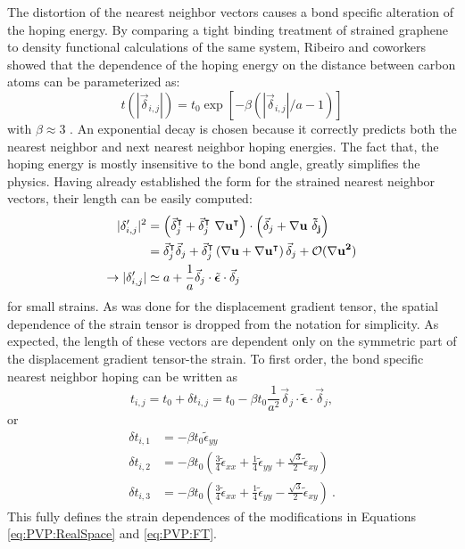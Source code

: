 The distortion of the nearest neighbor vectors causes a bond specific alteration of the hoping energy.
By comparing a tight binding treatment of strained graphene to density functional calculations of the same system, Ribeiro and coworkers showed that the dependence of the hoping energy on the distance between carbon atoms can be parameterized as:
\begin{equation*}
  t(|\vec{\delta}_{i,j}|)=t_0 \exp[-\beta (|\vec{\delta}_{i,j}|/a-1)]
\end{equation*}
with $\beta\approx 3$ \cite{Pereira2009,Ribeiro2009,CastroNeto2009}.
An exponential decay is chosen because it correctly predicts both the nearest neighbor and next nearest neighbor hoping energies.
The fact that, the hoping energy is mostly insensitive to the bond angle, greatly simplifies the physics.
Having already established the form for the strained nearest neighbor vectors, their length can be easily computed:
\begin{align*}
  |\delta'_{i,j}|^2&=\left(\vec{\delta}_{j}^{\intercal}+\vec{\delta}_{j}^{\intercal} \ \bf{\nabla u}^{\intercal} \right) \cdot
    \left(\vec{\delta}_{j}+\bf{\nabla u} \ \vec{\delta}_{j} \right) \\
    &=\vec{\delta}_{j}^{\intercal} \vec{\delta}_{j}+
      \vec{\delta}_{j}^{\intercal} \left(\bf{\nabla u}+\bf{\nabla u}^{\intercal} \right) \vec{\delta}_{j}+
      \mathcal{O}(\bf{\nabla u}^2) \\
  \rightarrow |\delta'_{i,j}|&\simeq a+\frac{1}{a} \vec{\delta}_{j} \cdot \tilde{\bm{\epsilon}} \cdot \vec{\delta}_{j}
\end{align*}
for small strains.
As was done for the displacement gradient tensor, the spatial dependence of the strain tensor is dropped from the notation for simplicity.
As expected, the length of these vectors are dependent only on the symmetric part of the displacement gradient tensor-the strain.
To first order, the bond specific nearest neighbor hoping can be written as
\begin{equation*}
  t_{i,j}=t_0+\delta t_{i,j}=t_0-\beta t_0 \frac{1}{a^2} \vec{\delta}_{j} \cdot \tilde{\bm{\epsilon}} \cdot \vec{\delta}_{j},
\end{equation*}
or
\begin{align}
  \delta t_{i,1}&=-\beta t_0 \tilde{\epsilon}_{yy} \nonumber \\
  \delta t_{i,2}&=-\beta t_0 \left( \frac{3}{4}\tilde{\epsilon}_{xx} +\frac{1}{4} \tilde{\epsilon}_{yy} + \frac{\sqrt{3}}{2} \tilde{\epsilon}_{xy} \right) \nonumber \\
  \delta t_{i,3}&=-\beta t_0 \left( \frac{3}{4}\tilde{\epsilon}_{xx} +\frac{1}{4} \tilde{\epsilon}_{yy} - \frac{\sqrt{3}}{2} \tilde{\epsilon}_{xy} \right)  \label{eq:PVP:dtij}\ .
\end{align}
This fully defines the strain dependences of the modifications in Equations \ref{eq:PVP:RealSpace} and \ref{eq:PVP:FT}.

